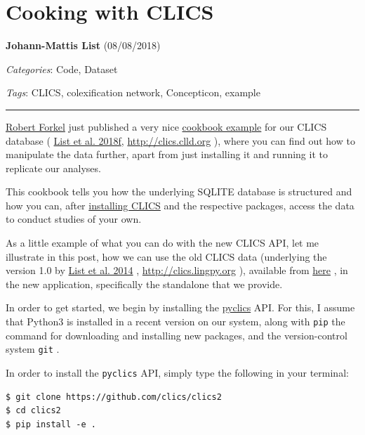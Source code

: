 \documentclass[
  english,
  a4paper,
  oneside,tablecaptionabove
]{scrbook}
\newcommand{\passthrough}[1]{#1}
\begin{document}
\hypertarget{cooking-with-clics}{%
\chapter{Cooking with CLICS}\label{cooking-with-clics}}

\textbf{Johann-Mattis List} (08/08/2018)

\emph{Categories}: Code, Dataset

\emph{Tags}: CLICS, colexification network, Concepticon, example

\begin{center}\rule{0.5\linewidth}{\linethickness}\end{center}

\href{https://github.com/xrotwang/}{Robert Forkel} just published a very
nice
\href{https://github.com/clics/clics2/tree/master/cookbook}{cookbook
example} for our CLICS database (
\href{http://bibliography.lingpy.org?key=List2018f}{List et al. 2018f},
\url{http://clics.clld.org} ), where you can find out how to manipulate
the data further, apart from just installing it and running it to
replicate our analyses.

This cookbook tells you how the underlying SQLITE database is structured
and how you can, after \href{https://github.com/clics/clics2}{installing
CLICS} and the respective packages, access the data to conduct studies
of your own.

As a little example of what you can do with the new CLICS API, let me
illustrate in this post, how we can use the old CLICS data (underlying
the version 1.0 by
\href{http://bibliography.lingpy.org?key=List2014f}{List et al. 2014} ,
\url{http://clics.lingpy.org} ), available from
\href{https://github.com/clics/clics1}{here} , in the new application,
specifically the standalone that we provide.

\leavevmode\hypertarget{markdown}{}%
In order to get started, we begin by installing the
\href{https://github.com/clics/clics2}{pyclics} API. For this, I assume
that Python3 is installed in a recent version on our system, along with
\passthrough{\lstinline!pip!} the command for downloading and installing
new packages, and the version-control system
\passthrough{\lstinline!git!} .

In order to install the \passthrough{\lstinline!pyclics!} API, simply
type the following in your terminal:

\begin{lstlisting}
$ git clone https://github.com/clics/clics2
$ cd clics2
$ pip install -e .
\end{lstlisting}
\end{document}
